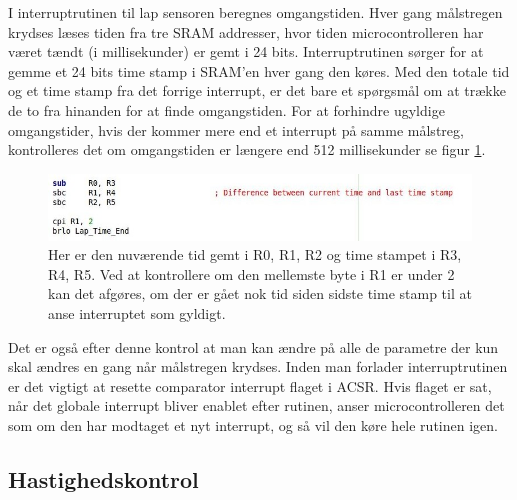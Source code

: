 I interruptrutinen til lap sensoren beregnes omgangstiden. Hver gang målstregen krydses læses tiden fra tre SRAM addresser, hvor tiden microcontrolleren har været tændt (i millisekunder) er gemt i 24 bits. Interruptrutinen sørger for at gemme et 24 bits time stamp i SRAM'en hver gang den køres. Med den totale tid og et time stamp fra det forrige interrupt, er det bare et spørgsmål om at trække de to fra hinanden for at finde omgangstiden. For at forhindre ugyldige omgangstider, hvis der kommer mere end et interrupt på samme målstreg, kontrolleres det om omgangstiden er længere end 512 millisekunder se figur \ref{fig:LapTime}.

\begin{figure}[h]

	\centering
		\includegraphics[scale=0.5]{Billeder/LapTime.jpg}
	\caption{Her er den nuværende tid gemt i R0, R1, R2 og time stampet i R3, R4, R5. Ved at kontrollere om den mellemste byte i R1 er under 2 kan det afgøres, om der er gået nok tid siden sidste time stamp til at anse interruptet som gyldigt.}
	\label{fig:LapTime}
	
\end{figure}

Det er også efter denne kontrol at man kan ændre på alle de parametre der kun skal ændres en gang når målstregen krydses. Inden man forlader interruptrutinen er det vigtigt at resette comparator interrupt flaget i ACSR. Hvis flaget er sat, når det globale interrupt bliver enablet efter rutinen, anser microcontrolleren det som om den har modtaget et nyt interrupt, og så vil den køre hele rutinen igen.

\subsection{Hastighedskontrol}
\label{sec:Hastighedskontrol}

